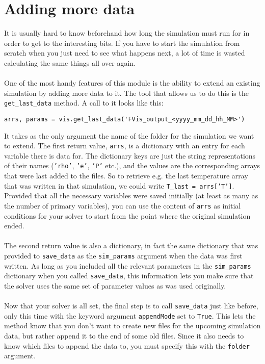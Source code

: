 \documentclass{article}
\newcommand{\ttt}[1]{\texttt{#1}}
\begin{document}
\section{Adding more data}
\label{sec:addat}
It is usually hard to know beforehand how long the simulation must run for in order to get to the interesting bits. If you have to start the simulation from scratch when you just need to see what happens next, a lot of time is wasted calculating the same things all over again.\\\\
One of the most handy features of this module is the ability to extend an existing simulation by adding more data to it. The tool that allows us to do this is the \ttt{get\_last\_data} method. A call to it looks like this:
\begin{lstlisting}[breaklines=false]
arrs, params = vis.get_last_data('FVis_output_<yyyy_mm_dd_hh_MM>')
\end{lstlisting}
It takes as the only argument the name of the folder for the simulation we want to extend. The first return value, \ttt{arrs}, is a dictionary with an entry for each variable there is data for. The dictionary keys are just the string representations of their names (\ttt{'rho'}, \ttt{'e'}, \ttt{'P'} etc.), and the values are the corresponding arrays that were last added to the files. So to retrieve e.g. the last temperature array that was written in that simulation, we could write \ttt{T\_last = arrs['T']}. Provided that all the necessary variables were saved initially (at least as many as the number of primary variables), you can use the content of \ttt{arrs} as initial conditions for your solver to start from the point where the original simulation ended.\\\\
The second return value is also a dictionary, in fact the same dictionary that was provided to \ttt{save\_data} as the \ttt{sim\_params} argument when the data was first written. As long as you included all the relevant parameters in the \ttt{sim\_params} dictionary when you called \ttt{save\_data}, this information lets you make sure that the solver uses the same set of parameter values as was used originally.\\\\
Now that your solver is all set, the final step is to call \ttt{save\_data} just like before, only this time with the keyword argument \ttt{appendMode} set to \ttt{True}. This lets the method know that you don't want to create new files for the upcoming simulation data, but rather append it to the end of some old files. Since it also needs to know which files to append the data to, you must specify this with the \ttt{folder} argument.\\\\
\end{document}
